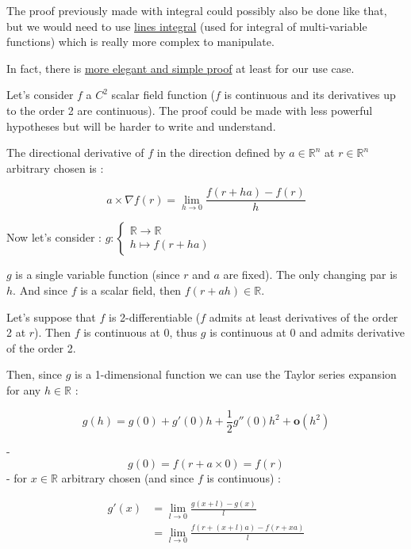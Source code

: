 \documentclass[12pt]{article}
\begin{document}
The proof previously made with integral could possibly also be done like that, but we would need to use \href{https://en.wikipedia.org/wiki/Line_integral}{lines integral} (used for integral of multi-variable functions) which is really more complex to manipulate.

In fact, there is \href{https://math.stackexchange.com/questions/221669/derivation-of-multivariable-taylor-series}{more elegant and simple proof} at least for our use case.

Let's consider $f$ a $C^2$ scalar field function ($f$ is continuous and its derivatives up to the order 2 are continuous). The proof could be made with less powerful hypotheses but will be harder to write and understand.

The directional derivative of $f$ in the direction defined by $a \in \mathbb{R}^n$ at $r \in \mathbb{R}^n$ arbitrary chosen is :

$$
a \times \nabla f(r) = \lim_{h \rightarrow 0} \frac{f(r+ha)-f(r)}{h}
$$

Now let's consider :
$
g : \begin{cases}
\mathbb{R} \rightarrow \mathbb{R} \\
h \mapsto f(r+ha)
\end{cases}
$

$g$ is a single variable function (since $r$ and $a$ are fixed). The only changing par is $h$. And since $f$ is a scalar field, then $f(r+ah) \in \mathbb{R}$.

Let's suppose that $f$ is 2-differentiable ($f$ admits at least derivatives of the order 2 at $r$). Then $f$ is continuous at $0$, thus $g$ is continuous at $0$ and admits derivative of the order 2.

Then, since $g$ is a 1-dimensional function we can use the Taylor series expansion for any $h \in \mathbb{R}$ :

$$
g(h) = g(0) + g'(0)h + \frac{1}{2}g''(0)h^2 + \mathbf{o}(h^2)
$$

- 
$$
g(0) = f(r+a \times 0) = f(r)
$$
- for $x \in \mathbb{R}$ arbitrary chosen (and since $f$ is continuous) :

\begin{equation*}
    \begin{split}
        g'(x) &= \lim_{l \rightarrow 0} \frac{g(x+l)-g(x)}{l} \\
        &=  \lim_{l \rightarrow 0} \frac{f(r+(x+l)a)-f(r+xa)}{l} \\
    \end{split}
\end{equation*}
\end{document}
